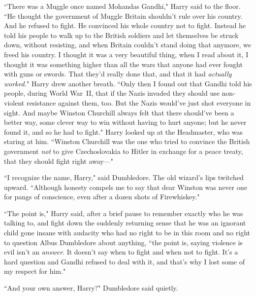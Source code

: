 ``There was a Muggle once named Mohandas Gandhi," Harry said to the floor. ``He thought the government of Muggle Britain shouldn't rule over his country. And he refused to fight. He convinced his whole country not to fight. Instead he told his people to walk up to the British soldiers and let themselves be struck down, without resisting, and when Britain couldn't stand doing that anymore, we freed his country. I thought it was a very beautiful thing, when I read about it, I thought it was something higher than all the wars that anyone had ever fought with guns or swords. That they'd really done that, and that it had \emph{actually worked.}" Harry drew another breath. ``Only then I found out that Gandhi told his people, during World War~II, that if the Nazis invaded they should use non-violent resistance against them, too. But the Nazis would've just shot everyone in sight. And maybe Winston Churchill always felt that there should've been a better way, some clever way to win without having to hurt anyone; but he never found it, and so he had to fight." Harry looked up at the Headmaster, who was staring at him. ``Winston Churchill was the one who tried to convince the British government \emph{not} to give Czechoslovakia to Hitler in exchange for a peace treaty, that they should fight right away—"

``I recognize the name, Harry," said Dumbledore. The old wizard's lips twitched upward. ``Although honesty compels me to say that dear Winston was never one for pangs of conscience, even after a dozen shots of Firewhiskey."

``The point is," Harry said, after a brief pause to remember exactly who he was talking to, and fight down the suddenly returning sense that he was an ignorant child gone insane with audacity who had no right to be in this room and no right to question Albus Dumbledore about anything, ``the point is, saying violence is evil isn't an \emph{answer}. It doesn't say when to fight and when not to fight. It's a hard question and Gandhi refused to deal with it, and that's why I lost some of my respect for him."

``And your own answer, Harry?" Dumbledore said quietly.

